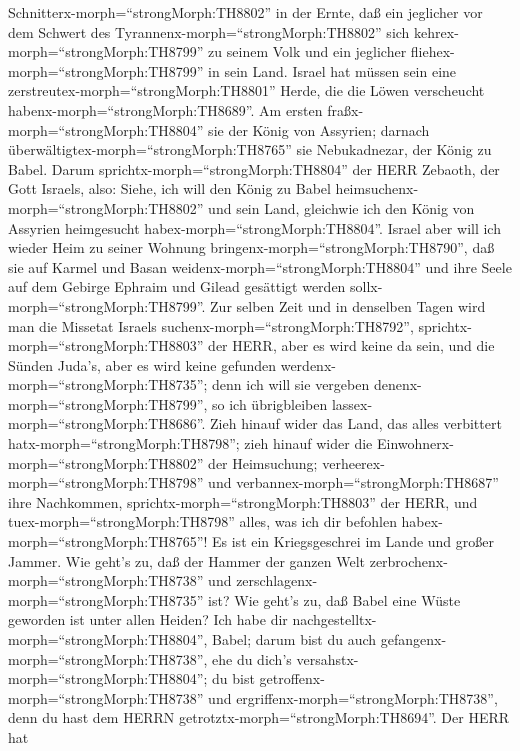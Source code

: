 Schnitterx-morph=``strongMorph:TH8802'' in der Ernte, daß ein jeglicher
vor dem Schwert des Tyrannenx-morph=``strongMorph:TH8802'' sich
kehrex-morph=``strongMorph:TH8799'' zu seinem Volk und ein jeglicher
fliehex-morph=``strongMorph:TH8799'' in sein Land.  Israel
hat müssen sein eine zerstreutex-morph=``strongMorph:TH8801'' Herde, die
die Löwen verscheucht habenx-morph=``strongMorph:TH8689''. Am ersten
fraßx-morph=``strongMorph:TH8804'' sie der König von Assyrien; darnach
überwältigtex-morph=``strongMorph:TH8765'' sie Nebukadnezar, der König
zu Babel.  Darum sprichtx-morph=``strongMorph:TH8804'' der
HERR Zebaoth, der Gott Israels, also: Siehe, ich will den König zu Babel
heimsuchenx-morph=``strongMorph:TH8802'' und sein Land, gleichwie ich
den König von Assyrien heimgesucht habex-morph=``strongMorph:TH8804''.
 Israel aber will ich wieder Heim zu seiner Wohnung
bringenx-morph=``strongMorph:TH8790'', daß sie auf Karmel und Basan
weidenx-morph=``strongMorph:TH8804'' und ihre Seele auf dem Gebirge
Ephraim und Gilead gesättigt werden sollx-morph=``strongMorph:TH8799''.
 Zur selben Zeit und in denselben Tagen wird man die
Missetat Israels suchenx-morph=``strongMorph:TH8792'',
sprichtx-morph=``strongMorph:TH8803'' der HERR, aber es wird keine da
sein, und die Sünden Juda's, aber es wird keine gefunden
werdenx-morph=``strongMorph:TH8735''; denn ich will sie vergeben
denenx-morph=``strongMorph:TH8799'', so ich übrigbleiben
lassex-morph=``strongMorph:TH8686''.  Zieh hinauf wider das
Land, das alles verbittert hatx-morph=``strongMorph:TH8798''; zieh
hinauf wider die Einwohnerx-morph=``strongMorph:TH8802'' der
Heimsuchung; verheerex-morph=``strongMorph:TH8798'' und
verbannex-morph=``strongMorph:TH8687'' ihre Nachkommen,
sprichtx-morph=``strongMorph:TH8803'' der HERR, und
tuex-morph=``strongMorph:TH8798'' alles, was ich dir befohlen
habex-morph=``strongMorph:TH8765''!  Es ist ein
Kriegsgeschrei im Lande und großer Jammer.  Wie geht's zu,
daß der Hammer der ganzen Welt zerbrochenx-morph=``strongMorph:TH8738''
und zerschlagenx-morph=``strongMorph:TH8735'' ist? Wie geht's zu, daß
Babel eine Wüste geworden ist unter allen Heiden?  Ich habe
dir nachgestelltx-morph=``strongMorph:TH8804'', Babel; darum bist du
auch gefangenx-morph=``strongMorph:TH8738'', ehe du dich's
versahstx-morph=``strongMorph:TH8804''; du bist
getroffenx-morph=``strongMorph:TH8738'' und
ergriffenx-morph=``strongMorph:TH8738'', denn du hast dem HERRN
getrotztx-morph=``strongMorph:TH8694''.  Der HERR hat
